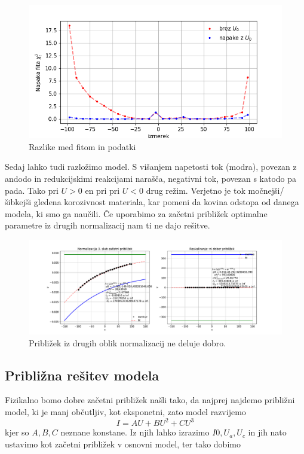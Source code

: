 \documentclass[11pt, a4paper]{article}
\begin{document}
  \begin{figure}[H]
    
  \includegraphics[width=15cm] {tretja_napaka_3.png}
 \caption{Razlike med fitom in podatki}
 \end{figure}

Sedaj lahko tudi razložimo model. S višanjem napetosti tok (modra), povezan z andodo in redukcijskimi reakcijami narašča, negativni tok, povezan s katodo pa pada. Tako pri $U>0$ en pri pri $U<0$ drug režim. Verjetno je tok močnejši/šibkejši gledena korozivnost materiala, kar pomeni da kovina odstopa od danega modela, ki smo ga naučili.
Če uporabimo za začetni približek optimalne parametre iz drugih normalizacij nam ti ne dajo rešitve. 
 \begin{figure}[H]
\hspace*{-3.5cm}     
  \includegraphics[width=24cm] {tretja_slab_fit2.pdf}
 \caption{Približek iz drugih oblik normalizacij ne deluje dobro.}
 \end{figure}
\subsection{Približna rešitev modela}
Fizikalno bomo dobre začetni približek našli tako, da najprej najdemo približni model, ki je manj občutljiv, kot eksponetni, zato model razvijemo
\begin{equation}
I = A U + B U^2 + C U^3
\end{equation}
kjer so $A,B,C$ neznane konstane.
Iz njih lahko izrazimo $I0,U_a,U_c$ in jih nato ustavimo kot začetni približek v osnovni model, ter tako dobimo
\end{document}
